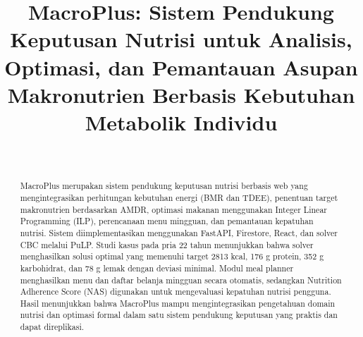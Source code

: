\documentclass[conference]{IEEEtran}
\begin{document}
\title{MacroPlus: Sistem Pendukung Keputusan Nutrisi
untuk Analisis, Optimasi, dan Pemantauan Asupan Makronutrien
Berbasis Kebutuhan Metabolik Individu}

\author{
    \\[0.4cm] %
}
\maketitle

\begin{abstract}
MacroPlus merupakan sistem pendukung keputusan nutrisi berbasis web yang mengintegrasikan perhitungan kebutuhan energi (BMR dan TDEE), penentuan target makronutrien berdasarkan AMDR, optimasi makanan menggunakan Integer Linear Programming (ILP), perencanaan menu mingguan, dan pemantauan kepatuhan nutrisi. Sistem diimplementasikan menggunakan FastAPI, Firestore, React, dan solver CBC melalui PuLP. Studi kasus pada pria 22 tahun menunjukkan bahwa solver menghasilkan solusi optimal yang memenuhi target 2813 kcal, 176 g protein, 352 g karbohidrat, dan 78 g lemak dengan deviasi minimal. Modul meal planner menghasilkan menu dan daftar belanja mingguan secara otomatis, sedangkan Nutrition Adherence Score (NAS) digunakan untuk mengevaluasi kepatuhan nutrisi pengguna. Hasil menunjukkan bahwa MacroPlus mampu mengintegrasikan pengetahuan domain nutrisi dan optimasi formal dalam satu sistem pendukung keputusan yang praktis dan dapat direplikasi.
\end{abstract}
\end{document}
